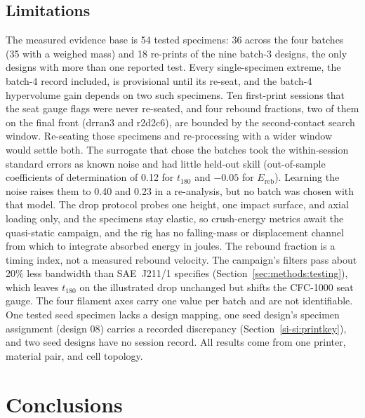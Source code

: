 \documentclass[lineno,nocopyright,upint,varvw,hyphenate]{asmejour}
\newcommand{\siref}[1]{\ref*{si-#1}}
\begin{document}
\subsection{Limitations}
The measured evidence base is 54 tested specimens: 36
across the four batches (35 with a weighed mass) and 18 re-prints of
the nine batch-3 designs, the only designs with more than one reported
test. Every single-specimen extreme, the batch-4 record included, is
provisional until its re-seat, and the batch-4 hypervolume gain depends
on two such specimens. Ten first-print sessions that the seat gauge
flags were never re-seated, and four rebound fractions, two of them on
the final front (drran3 and r2d2c6), are bounded by the second-contact
search window. Re-seating those specimens and re-processing with a
wider window would settle both. The surrogate
that chose the batches took the within-session standard errors as known
noise and had little held-out skill (out-of-sample coefficients of
determination of 0.12 for $t_{180}$ and $-0.05$ for $E_{\mathrm{reb}}$).
Learning the noise raises them to 0.40 and 0.23 in a re-analysis, but no
batch was chosen with that model. The drop protocol
probes one height, one impact surface, and axial loading only, and the
specimens stay elastic, so crush-energy metrics await the quasi-static
campaign, and the rig has no falling-mass or displacement channel from
which to integrate absorbed energy in joules. The rebound fraction is a
timing index, not a measured rebound velocity. The campaign's filters
pass about 20\% less bandwidth than SAE~J211/1 specifies
(Section~\ref{sec:methods:testing}), which leaves $t_{180}$ on the
illustrated drop unchanged but shifts the CFC-1000 seat gauge. The four
filament axes carry one value per batch and are not identifiable. One
tested seed specimen lacks a design mapping, one seed design's specimen
assignment (design 08) carries a recorded discrepancy
(Section~\siref{si:printkey}), and two seed designs have no
session record. All results come from one printer, material pair, and
cell topology.


\section{Conclusions}
\label{sec:conclusions}
\end{document}
